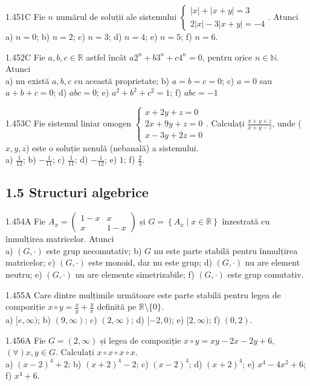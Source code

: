 \documentclass[11pt]{article}
\begin{document}
1.451C Fie $n$ numărul de soluții ale sistemului $\left\{\begin{array}{l}|x|+|x+y|=3 \\ 2|x|-3|x+y|=-4\end{array}\right.$. Atunci\\ a) $n=0$; b) $n=2$; c) $n=3$; d) $n=4$; e) $n=5$; f) $n=6$.

1.452C Fie $a, b, c \in \mathbb{R}$ astfel încât $a 2^{n}+b 3^{n}+c 4^{n}=0$, pentru orice $n \in \mathbb{N}$.\\Atunci\\ a) nu există $a, b, c$ cu această proprietate; b) $a=b=c=0$; c) $a=0$ sau $a+b+c=0$; d) $a b c=0$; e) $a^{2}+b^{2}+c^{2}=1$; f) $a b c=-1$

1.453C Fie sistemul liniar omogen $\left\{\begin{array}{l}x+2 y+z=0 \\ 2 x+9 y+z=0 \\ x-3 y+2 z=0\end{array}\right.$. Calculați $\frac{x+y+z}{x+y-z}$, unde ($x, y, z$) este o soluție nenulă (nebanală) a sistemului.\\ a) $\frac{1}{12}$; b) $-\frac{1}{11}$; c) $\frac{1}{11}$; d) $-\frac{1}{12}$; e) $1$; f) $\frac{2}{3}$.

\subsection*{1.5 Structuri algebrice}
1.454A Fie $A_{x}=\left(\begin{array}{cc}1-x & x \\ x & 1-x\end{array}\right)$ și $G=\left\{A_{x} \mid x \in \mathbb{R}\right\}$ înzestrată cu înmulțirea matricelor. Atunci\\ a) $(G, \cdot)$ este grup necomutativ; b) $G$ nu este parte stabilă pentru înmulțirea matricelor; c) $(G, \cdot)$ este monoid, dar nu este grup; d) $(G, \cdot)$ nu are element neutru; e) $(G, \cdot)$ nu are elemente simetrizabile; f) $(G, \cdot)$ este grup comutativ.

1.455A Care dintre mulțimile următoare este parte stabilă pentru legea de compoziție $x \circ y=\frac{x}{y}+\frac{y}{x}$ definită pe $\mathbb{R} \setminus\{0\}$.\\ a) $[e, \infty)$; b) $(9, \infty)$; c) $(2, \infty)$; d) $[-2,0)$; e) $[2, \infty)$; f) $(0,2)$.

1.456A Fie $G=(2, \infty)$ și legea de compoziție $x \circ y=x y-2 x-2 y+6$, $(\forall) x, y \in G$. Calculați $x \circ x \circ x \circ x$.\\ a) $(x-2)^{4}+2$; b) $(x+2)^{4}-2$; c) $(x-2)^{4}$; d) $(x+2)^{4}$; e) $x^{4}-4 x^{2}+6$;\\ f) $x^{4}+6$.
\end{document}
